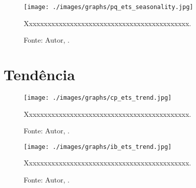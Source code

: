 


\begin{figure}[H]
    \centering
    \texttt{[image: ./images/graphs/pq\_ets\_seasonality.jpg]}
    \caption{Xxxxxxxxxxxxxxxxxxxxxxxxxxxxxxxxxxxxxxxxxxxx.}
    \label{fig:pq_ets_seasonality.jpg}
    \caption*{Fonte: Autor, \imprimirdata.}
\end{figure}






\section{Tendência}





\begin{figure}[H]
    \centering
    \texttt{[image: ./images/graphs/cp\_ets\_trend.jpg]}
    \caption{Xxxxxxxxxxxxxxxxxxxxxxxxxxxxxxxxxxxxxxxxxxxx.}
    \label{fig:cp_ets_trend.jpg}
    \caption*{Fonte: Autor, \imprimirdata.}
\end{figure}




\begin{figure}[H]
    \centering
    \texttt{[image: ./images/graphs/ib\_ets\_trend.jpg]}
    \caption{Xxxxxxxxxxxxxxxxxxxxxxxxxxxxxxxxxxxxxxxxxxxx.}
    \label{fig:ib_ets_trend.jpg}
    \caption*{Fonte: Autor, \imprimirdata.}
\end{figure}

